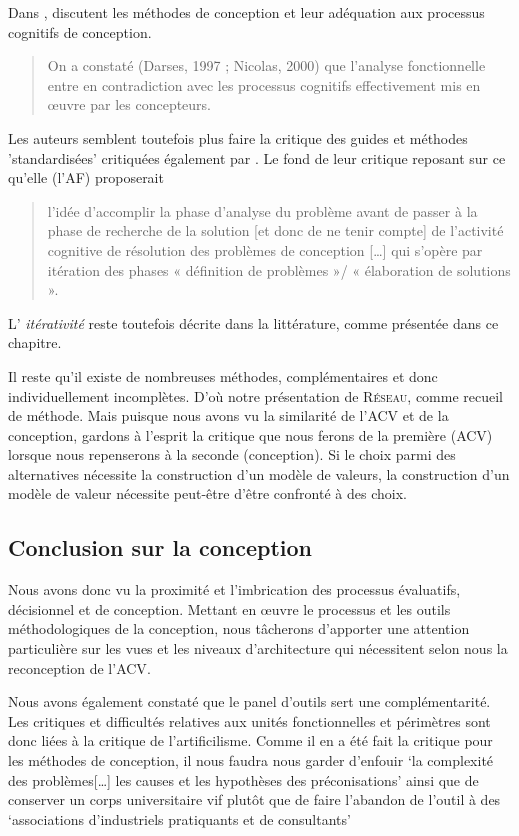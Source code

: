 Dans , \citeauthor{darses_francoise_assister_2001} discutent les méthodes de conception et leur adéquation aux processus cognitifs de conception.

\blockcquote{darses_francoise_assister_2001}{On a constaté (Darses, 1997 ; Nicolas, 2000) que l’analyse fonctionnelle entre en contradiction avec les processus cognitifs effectivement mis en œuvre par les concepteurs.}
Les auteurs semblent toutefois plus faire la critique des guides et méthodes 'standardisées' critiquées également par \citeauthor{yannou_preconception_2001}.
Le fond de leur critique reposant sur ce qu'elle (l'\gls{AF}) proposerait
\blockcquote{darses_francoise_assister_2001}{
l'idée d'accomplir la phase d’analyse du problème avant de passer à la phase de recherche de la solution [et donc de ne tenir compte] de l'activité cognitive de résolution des problèmes de conception [\ldots] qui s'opère par itération des phases « définition de problèmes »/ « élaboration de solutions ».
}
L' \textit{itérativité} reste toutefois décrite dans la littérature, comme présentée dans ce chapitre.

Il reste qu'il existe de nombreuses méthodes, complémentaires et donc individuellement incomplètes.
D'où notre présentation de \textsc{Réseau}, comme recueil de méthode.
Mais puisque nous avons vu la similarité de l'\gls{ACV} et de la conception, gardons à l'esprit la critique que nous ferons de la première (ACV) lorsque nous repenserons à la seconde (conception).
Si le choix parmi des alternatives nécessite la construction d'un modèle de valeurs, la construction d'un modèle de valeur nécessite peut-être d'être confronté à des choix.

\subsection{Conclusion sur la conception}
Nous avons donc vu la proximité et l'imbrication des processus évaluatifs, décisionnel et de conception.
Mettant en œuvre le processus et les outils méthodologiques de la conception, nous tâcherons d'apporter une attention particulière sur les vues et les niveaux d'architecture qui nécessitent selon nous la reconception de l'\gls{ACV}.

Nous avons également constaté que le panel d'outils sert une complémentarité.
Les critiques et difficultés relatives aux unités fonctionnelles et périmètres sont donc liées à la critique de l'artificilisme.
Comme il en a été fait la critique pour les méthodes de conception, il nous faudra nous garder d'enfouir `la complexité des problèmes[\ldots] les causes et les hypothèses des préconisations' ainsi que de conserver un corps universitaire vif plutôt que de faire l'abandon de l'outil à des `associations d'industriels pratiquants et de consultants'

